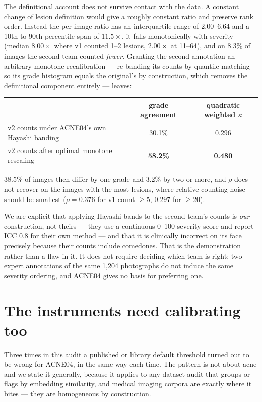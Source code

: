 \documentclass[11pt]{article}
\begin{document}
The definitional account does not survive contact with the data. A constant change of
lesion definition would give a roughly constant ratio and preserve rank order. Instead
the per-image ratio has an interquartile range of 2.00--6.64 and a
10th-to-90th-percentile span of $11.5\times$, it falls monotonically with severity
(median $8.00\times$ where v1 counted 1--2 lesions, $2.00\times$ at 11--64), and on
8.3\% of images the second team counted \emph{fewer}. Granting the second annotation an
arbitrary monotone recalibration --- re-banding its counts by quantile matching so its
grade histogram equals the original's by construction, which removes the definitional
component entirely --- leaves:

\begin{center}
\begin{tabular}{lcc}
\toprule
& grade agreement & quadratic weighted $\kappa$ \\
\midrule
v2 counts under ACNE04's own Hayashi banding & 30.1\% & 0.296 \\
v2 counts after optimal monotone rescaling & \textbf{58.2\%} & \textbf{0.480} \\
\bottomrule
\end{tabular}
\end{center}

38.5\% of images then differ by one grade and 3.2\% by two or more, and $\rho$ does not
recover on the images with the most lesions, where relative counting noise should be
smallest ($\rho = 0.376$ for v1 count $\geq 5$, $0.297$ for $\geq 20$).

We are explicit that applying Hayashi bands to the second team's counts is \emph{our}
construction, not theirs --- they use a continuous 0--100 severity score and report
ICC 0.8 for their own method --- and that it is clinically incorrect on its face
precisely because their counts include comedones. That is the demonstration rather than
a flaw in it. It does not require deciding which team is right: two expert annotations of
the same 1{,}204 photographs do not induce the same severity ordering, and ACNE04 gives
no basis for preferring one.

\section{The instruments need calibrating too}
\label{sec:calibration}

Three times in this audit a published or library default threshold turned out to be wrong
for ACNE04, in the same way each time. The pattern is not about acne and we state it
generally, because it applies to any dataset audit that groups or flags by embedding
similarity, and medical imaging corpora are exactly where it bites --- they are
homogeneous by construction.
\end{document}
